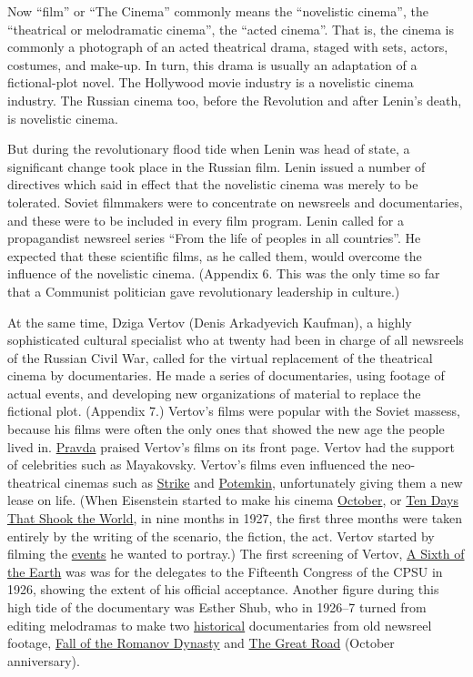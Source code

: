 Now \enquote{film} or \enquote{The Cinema} commonly means the \enquote{novelistic cinema},
the \enquote{theatrical or melodramatic cinema}, the \enquote{acted cinema}. 
That is, the cinema is commonly a photograph of an acted theatrical
drama, staged with sets, actors, costumes, and make-up. In
turn, this drama is usually an adaptation of a fictional-plot novel. 
The Hollywood movie industry is a novelistic cinema industry. The
Russian cinema too, before the Revolution and after Lenin's death, 
is novelistic cinema. 

But during the revolutionary flood tide when Lenin was head of
state, a significant change took place in the Russian film. Lenin
issued a number of directives which said in effect that the novelistic
cinema was merely to be tolerated. Soviet filmmakers were 
to concentrate on newsreels and documentaries, and these were 
to be included in every film program. Lenin called for a propagandist 
newsreel series \enquote{From the life of peoples in all countries}.
He expected that these scientific films, as he called them, would 
overcome the influence of the novelistic cinema. (Appendix 6. This
was the only time so far that a Communist politician gave revolutionary 
leadership in culture.) 

At the same time, Dziga Vertov (Denis Arkadyevich Kaufman), a
highly sophisticated cultural specialist who at twenty had been 
in charge of all newsreels of the Russian Civil War, called for the 
virtual replacement of the theatrical cinema by documentaries. He 
made a series of documentaries, using footage of actual events,
and developing new organizations of material to replace the fictional plot. (Appendix 7.)
Vertov's films were popular with the 
Soviet massess, because his films were often the only ones that
showed the new age the people lived in. \uline{Pravda} praised Vertov's
films on its front page. Vertov had the support of celebrities such
as Mayakovsky. Vertov's films even influenced the neo-theatrical
cinemas such as \uline{Strike} and \uline{Potemkin}, unfortunately giving them a 
new lease on life. (When Eisenstein started to make his cinema
\uline{October}, or \uline{Ten Days That Shook the World}, in nine months in
1927, the first three months were taken entirely by the writing of 
the scenario, the fiction, the act. Vertov started by filming the
\uline{events} he wanted to portray.) The first screening of Vertov, \uline{A Sixth
of the Earth} was was for the delegates to the Fifteenth Congress of the
CPSU in 1926, showing the extent of his official acceptance.
Another figure during this high tide of the documentary was Esther 
Shub, who in 1926--7 turned from editing melodramas to make two 
\uline{historical} documentaries from old newsreel footage, \uline{Fall of the
Romanov Dynasty} and \uline{The Great Road} (October anniversary). 

